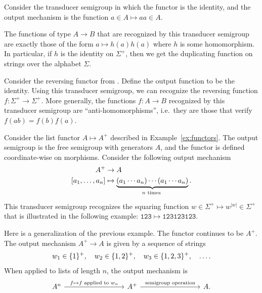 \begin{example}\label{ex:duplicator}
    Consider the transducer semigroup in which the functor is the identity, and the output mechanism is the function $a \in A \mapsto aa \in A$.

    The functions of type $A \to B$ that are recognized by this transducer semigroup are exactly those of the form $a \mapsto h(a)h(a)$ where $h$ is some homomorphism. In particular, if $h$ is the identity on $\Sigma^+$, then we get the duplicating function on strings over the alphabet $\Sigma$.
\end{example}



\begin{example}
    Consider the reversing functor from . Define the output function to be the identity. Using this transducer semigroup, we can recognize the reversing function $f : \Sigma^+ \to \Sigma^+$. More generally, the functions $f : A \to B$ recognized by this transducer semigroup are \enquote{anti-homomorphisms}, i.e.\ they are those that verify $f(ab) = f(b)f(a)$.
\end{example}

\begin{example}\label{ex:squaring}
    Consider the list functor $A \mapsto A^+$ described in Example~\ref{ex:functors}. The output semigroup is the free semigroup with generators $A$, and the functor is defined coordinate-wise on morphisms. Consider the following output mechanism 
    \begin{align*}
    A^+ & \to A\\
    [a_1,\ldots,a_n] & \mapsto \myunderbrace{(a_1 \cdots a_n) \cdots (a_1 \cdots a_n)}{$n$ times}.
    \end{align*}
    This transducer semigroup recognizes the squaring function $w \in \Sigma^+ \mapsto w^{|w|} \in \Sigma^+$ that is illustrated in the following example: $\mathtt{123 \mapsto 123123123}$.
\end{example}

\begin{example}\label{ex:squaring-generalized}
    Here is a generalization of the previous example. The functor continues to be $A^+$. The output mechanism $A^+ \to A$ is given by a sequence of strings 
    \begin{align*}
    w_1 \in \{1\}^+, \quad w_2 \in \{1,2\}^+, \quad w_3 \in \{1,2,3\}^+, \quad \ldots.
    \end{align*}
    When applied to lists of  length $n$, the output mechanism is
    \[
        \begin{tikzcd}
            [column  sep=3cm]
        A^n
        \ar[r,"f \mapsto \text{$f$ applied to $w_n$}"]
        &
        A^+ 
        \ar[r,"\text{semigroup operation}"]
        & 
        A.
        \end{tikzcd}
        \]
\end{example}

